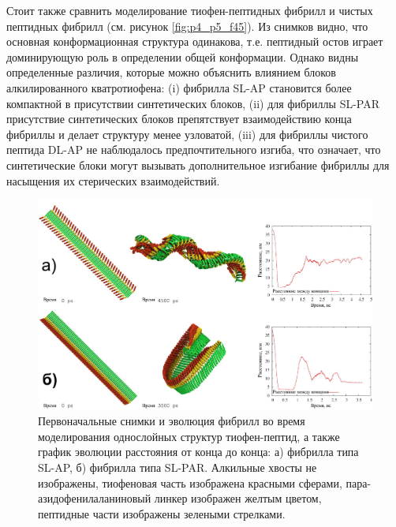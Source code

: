     Стоит также сравнить моделирование тиофен-пептидных фибрилл и чистых пептидных фибрилл (см. рисунок \ref{fig:p4_p5_f45}). Из снимков видно, что основная конформационная структура одинакова, т.е. пептидный остов играет доминирующую роль в определении общей конформации. Однако видны определенные различия, которые можно объяснить влиянием блоков алкилированного кватротиофена: (i) фибрилла SL-AP становится более компактной в присутствии синтетических блоков, (ii) для фибриллы SL-PAR присутствие синтетических блоков препятствует взаимодействию конца фибриллы и делает структуру менее узловатой, (iii) для фибриллы чистого пептида DL-AP не наблюдалось предпочтительного изгиба, что означает, что синтетические блоки могут вызывать дополнительное изгибание фибриллы для насыщения их стерических взаимодействий.


\begin{figure} [H]
    \centering
    \includegraphics[width=\textwidth]{images/p4/punkt5/part4_p5_f43.pdf}
    \caption[Первоначальные снимки и эволюция фибрилл во время моделирования однослойных структур тиофен-пептид]{Первоначальные снимки и эволюция фибрилл во время моделирования однослойных структур тиофен-пептид, а также график эволюции расстояния от конца до конца: а) фибрилла типа SL-AP, б) фибрилла типа SL-PAR. Алкильные хвосты не изображены, тиофеновая часть изображена красными сферами, пара-азидофенилаланиновый линкер изображен желтым цветом, пептидные части изображены зелеными стрелками.}
    \label{fig:p4_p5_f43}
\end{figure}


